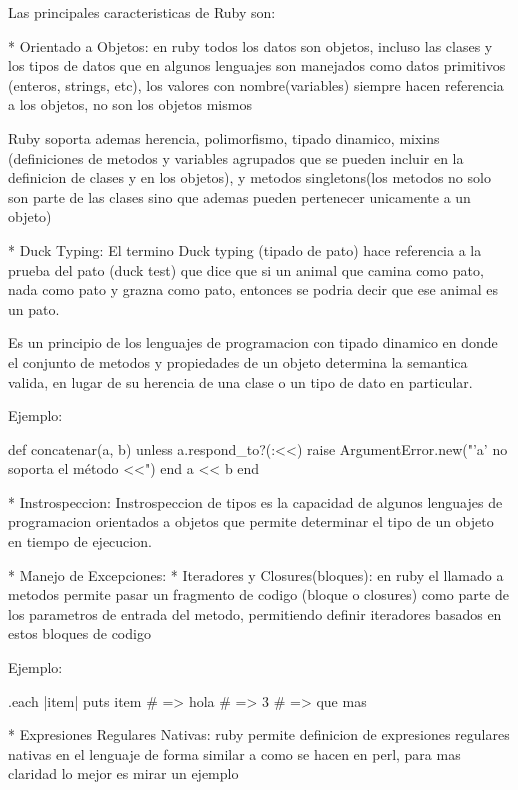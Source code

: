 Las principales caracteristicas de Ruby son:

* Orientado a Objetos: en ruby todos los datos son objetos, incluso las clases y los
tipos de datos que en algunos lenguajes son manejados como datos primitivos
(enteros, strings, etc), los valores con nombre(variables) siempre hacen referencia a
los objetos, no son los objetos mismos

Ruby soporta ademas herencia, polimorfismo, tipado dinamico, mixins (definiciones de
metodos y variables agrupados que se pueden incluir en la definicion de clases y en los
objetos), y metodos singletons(los metodos no solo son parte de las clases sino que
ademas pueden pertenecer unicamente a un objeto)

* Duck Typing: El termino Duck typing (tipado de pato) hace referencia a la prueba del
pato (duck test) que dice que si un animal que camina como pato, nada como pato y grazna
como pato, entonces se podria decir que ese animal es un pato.

Es un principio de los lenguajes de programacion con tipado dinamico en donde el conjunto
de metodos y propiedades de un objeto determina la semantica valida, en lugar de su 
herencia de una clase o un tipo de dato en particular.

Ejemplo:

\begin{verbatim*}
def concatenar(a, b)
  unless a.respond_to?(:<<)
    raise ArgumentError.new("'a' no soporta el método <<")
  end
  a << b
end
\end{verbatim*}

* Instrospeccion: Instrospeccion de tipos es la capacidad de algunos lenguajes de
programacion orientados a objetos que permite determinar el tipo de un objeto en tiempo
de ejecucion.

* Manejo de Excepciones: 
* Iteradores y Closures(bloques): en ruby el llamado a metodos permite pasar un fragmento
de codigo (bloque o closures) como parte de los parametros de entrada del metodo,
permitiendo definir iteradores basados en estos bloques de codigo

Ejemplo:

\begin{verbatim*}
.each {|item| puts item}
# => hola
# => 3
# => que mas
\end{verbatim*}


* Expresiones Regulares Nativas: ruby permite definicion de expresiones regulares nativas
en el lenguaje de forma similar a como se hacen en perl, para mas claridad lo mejor es
mirar un ejemplo

